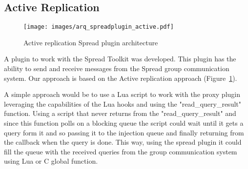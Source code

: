 
\newpage

\subsection{Active Replication}


\begin{figure}[h!]
\centering    
\texttt{[image: images/arq\_spreadplugin\_active.pdf]}
\caption{Active replication Spread plugin architecture}
\label{fig:spread_plugin_active}
\end{figure}


A plugin to work with the Spread Toolkit was developed. This plugin has the ability to send and receive messages from the Spread group communication system. Our approach is based on the Active replication approach (Figure~\ref{fig:spread_plugin_active}).

A simple approach would be to use a Lua script to work with the proxy plugin leveraging the capabilities of the Lua hooks and using the "read\_query\_result" function. Using a script that never returns from the "read\_query\_result" and since this function polls on a blocking queue the script could wait until it gets a query form it and so passing it to the injection queue and finally returning from the callback when the query is done. This way, using the spread plugin it could fill the queue with the received queries from the group communication system using Lua or C global function.	


